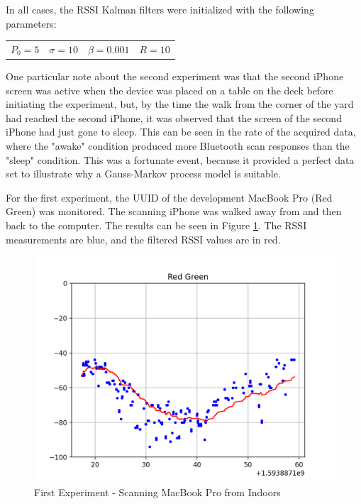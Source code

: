 \documentclass[12pt]{article}
\begin{document}
In all cases, the RSSI Kalman filters were initialized with the following parameters:

\begin{center}
    \begin{tabular}{cccc}
        $P_0 = 5$ 
        &
        $\sigma = 10$
        &
        $\beta = 0.001$
        &
        $R = 10$
    \end{tabular}
\end{center}

One particular note about the second experiment was that the second iPhone screen was
active when the device was placed on a table on the deck before initiating the experiment,
but, by the time the walk from the corner of the yard had reached the second iPhone, it was
observed that the screen of the second iPhone had just gone to sleep. This can be seen in
the rate of the acquired data, where the "awake" condition produced more Bluetooth scan
responses than the "sleep" condition. This was a fortunate event, because it provided a
perfect data set to illustrate why a Gauss-Markov process model is suitable.

For the first experiment, the UUID of the development MacBook Pro (Red Green) was
monitored. The scanning iPhone was walked away from and then back to the computer. The
results can be seen in Figure \ref{fig:experiment-1-mbp}. The RSSI measurements are blue,
and the filtered RSSI values are in red.

\begin{figure}[ht]
    \centering
    \includegraphics[width=1.0\textwidth]{Experiment-1-MBP.png}
    \caption{First Experiment - Scanning MacBook Pro from Indoors}
    \label{fig:experiment-1-mbp}
\end{figure}
\end{document}
